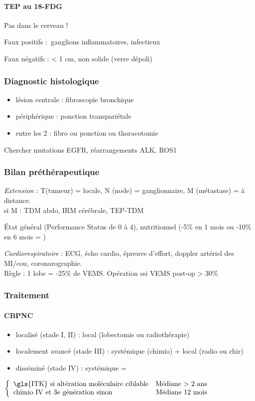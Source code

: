 \documentclass[11pt]{article}
\begin{document}
\paragraph{TEP au 18-FDG}
\label{sec:org9dbccbb}
Pas dans le cerveau !

Faux positifs : ganglions inflammatoires, infectieux

Faux négatifs : < 1 cm, non solide (verre dépoli)

\subsubsection{Diagnostic histologique}
\label{sec:org2fb41c5}

\begin{itemize}
\item lésion centrale : fibroscopie bronchique
\item périphérique : ponction transpariétale
\item entre les 2 : fibro ou ponction ou thoracotomie
\end{itemize}

Chercher mutations EGFR, réarrangements ALK, ROS1

\subsubsection{Bilan préthérapeutique}
\label{sec:org7018384}
\emph{Extension}  : T(tumeur) = locale, N (node) = ganglionnaire, M
(métastase) = à distance. \\
si M : TDM abdo, IRM cérébrale, TEP-TDM

État général (Performance Status de 0 à 4), nutritionnel (-5\% en 1 mois ou
-10\% en 6 mois = \frownie{})

\emph{Cardiorespiratoire} : ECG, écho cardio, épreuve d'effort, doppler artériel des MI/cou,
coronarographie.\\
Règle : 1 lobe = -25\% de VEMS. Opération ssi VEMS post-op > 30\%
\subsubsection{Traitement}
\label{sec:org44ddbea}
\paragraph{CBPNC}
\label{sec:org1eb1dbe}

\begin{itemize}
\item localisé (stade I, II) : local (lobectomie ou radiothérapie)
\item localement avancé (stade III) : systémique (chimio) + local (radio ou
chir)
\item disséminé (stade IV) : systémique =
\end{itemize}
$\left \{
  \begin{array}{lr}
    \text{\gls{ITK} si altération moléculaire ciblable} & \text{Médiane > 2 ans}\\
    \text{chimio IV et 3e génération sinon} & \text{Médiane 12 mois}\\
  \end{array}
\right.$
\end{document}
